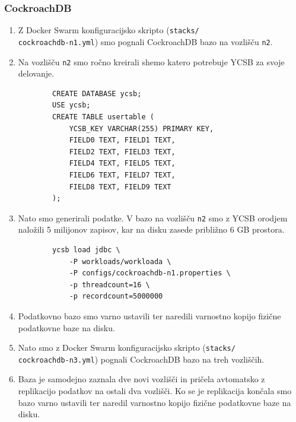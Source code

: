 \documentclass[a4paper, 12pt]{book}
\begin{document}
\subsubsection{CockroachDB}
\begin{enumerate}
    \item Z Docker Swarm konfiguracijsko skripto (\texttt{stacks/\\cockroachdb-n1.yml}) smo pognali CockroachDB bazo na vozlišču \texttt{n2}.
    \item Na vozlišču \texttt{n2} smo ročno kreirali shemo katero potrebuje YCSB za svoje delovanje.
    \begin{listing}[H]
    \begin{verbatim}
        CREATE DATABASE ycsb;
        USE ycsb;
        CREATE TABLE usertable (
            YCSB_KEY VARCHAR(255) PRIMARY KEY,
            FIELD0 TEXT, FIELD1 TEXT,
            FIELD2 TEXT, FIELD3 TEXT,
            FIELD4 TEXT, FIELD5 TEXT,
            FIELD6 TEXT, FIELD7 TEXT,
            FIELD8 TEXT, FIELD9 TEXT
        );
    \end{verbatim}
    \label{code-ycsb-schema-cockroach}
    \end{listing}
    \item Nato smo generirali podatke. V bazo na vozlišču \texttt{n2} smo z YCSB orodjem naložili 5 milijonov zapisov, kar na disku zasede približno 6 GB prostora.
    \begin{listing}[H]
    \begin{verbatim}
        ycsb load jdbc \
            -P workloads/workloada \
            -P configs/cockroachdb-n1.properties \
            -p threadcount=16 \
            -p recordcount=5000000
    \end{verbatim}
    \label{code-ycsb-load-cockroach}
    \end{listing}
    \item Podatkovno bazo smo varno ustavili ter naredili varnostno kopijo fizične podatkovne baze na disku.
    \item Nato smo z Docker Swarm konfiguracijsko skripto (\texttt{stacks/\\cockroachdb-n3.yml}) pognali CockroachDB bazo na treh vozliščih.
    \item Baza je samodejno zaznala dve novi vozlišči in pričela avtomatsko z replikacijo podatkov na ostali dva vozlišči. Ko se je replikacija končala smo bazo varno ustavili ter naredil varnostno kopijo fizične podatkovne baze na disku.
\end{enumerate}
\end{document}
